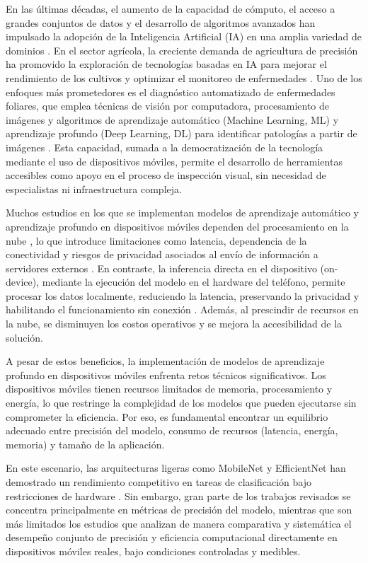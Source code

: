 En las últimas décadas, el aumento de la capacidad de cómputo, el acceso a grandes conjuntos de datos y el desarrollo de algoritmos avanzados han 
impulsado la adopción de la Inteligencia Artificial (IA) en una amplia variedad de dominios \cite{dhar2019ondevice}. En el sector agrícola, la creciente demanda de 
agricultura de precisión ha promovido la exploración de tecnologías basadas en IA para mejorar el rendimiento de los cultivos y optimizar el 
monitoreo de enfermedades \cite{ahmed2021mobile,johannes2017automatic,Niaz2025Efficient}. Uno de los enfoques más prometedores es el diagnóstico automatizado de enfermedades foliares, que emplea 
técnicas de visión por computadora, procesamiento de imágenes y algoritmos de aprendizaje automático (Machine Learning, ML) y aprendizaje profundo (Deep Learning, DL) para identificar 
patologías a partir de imágenes \cite{agronomy13040961}. Esta capacidad, sumada a la democratización de la tecnología mediante el uso de dispositivos móviles, 
permite el desarrollo de herramientas accesibles como apoyo en el proceso de inspección visual, sin necesidad de especialistas ni infraestructura 
compleja.

Muchos estudios en los que se implementan modelos de aprendizaje automático y aprendizaje profundo en dispositivos móviles dependen del procesamiento en 
la nube \cite{ahmed2021mobile,Tembhurne2023}, lo que introduce limitaciones como latencia, dependencia de la conectividad y riesgos de privacidad asociados al envío de 
información a servidores externos \cite{xiao2025understanding}. En contraste, la inferencia directa en el dispositivo (on-device), mediante la ejecución del modelo en 
el hardware del teléfono, permite procesar los datos localmente, reduciendo la latencia, preservando la privacidad y habilitando el funcionamiento 
sin conexión \cite{dhar2019ondevice}. Además, al prescindir de recursos en la nube, se disminuyen los costos operativos y se mejora la accesibilidad 
de la solución.

A pesar de estos beneficios, la implementación de modelos de aprendizaje profundo en dispositivos móviles enfrenta retos técnicos significativos.
Los dispositivos móviles tienen recursos limitados de memoria, procesamiento y energía, lo que restringe la complejidad de los modelos que pueden 
ejecutarse sin comprometer la eficiencia. Por eso, es fundamental encontrar un equilibrio adecuado entre precisión del modelo, consumo de recursos
(latencia, energía, memoria) y tamaño de la aplicación.

En este escenario, las arquitecturas ligeras como MobileNet y EfficientNet han demostrado un rendimiento competitivo en tareas de clasificación bajo
restricciones de hardware \cite{zainab2025plant,geetharamani2019identification,subramaniam2026comparative}. Sin embargo, gran parte de los trabajos revisados se concentra principalmente en métricas de precisión del modelo, mientras que son 
más limitados los estudios que analizan de manera comparativa y sistemática el desempeño conjunto de precisión y eficiencia computacional directamente
en dispositivos móviles reales, bajo condiciones controladas y medibles.

